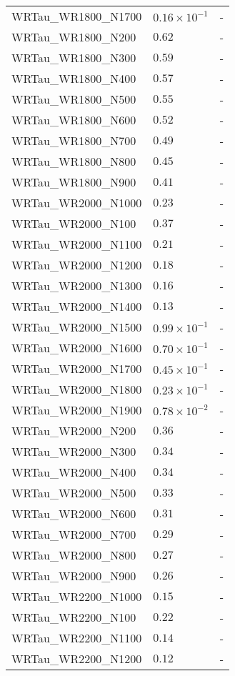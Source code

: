 \begin{longtable}[c]{| C{.35\textwidth} | C{.15\textwidth} | C{.1\textwidth}|}
    WRTau\_WR1800\_N1700 & $0.16\times10^{-1}$ & - \\
    WRTau\_WR1800\_N200 & $0.62$ & - \\
    WRTau\_WR1800\_N300 & $0.59$ & - \\
    WRTau\_WR1800\_N400 & $0.57$ & - \\
    WRTau\_WR1800\_N500 & $0.55$ & - \\
    WRTau\_WR1800\_N600 & $0.52$ & - \\
    WRTau\_WR1800\_N700 & $0.49$ & - \\
    WRTau\_WR1800\_N800 & $0.45$ & - \\
    WRTau\_WR1800\_N900 & $0.41$ & - \\ \hline
    WRTau\_WR2000\_N1000 & $0.23$ & - \\
    WRTau\_WR2000\_N100 & $0.37$ & - \\
    WRTau\_WR2000\_N1100 & $0.21$ & - \\
    WRTau\_WR2000\_N1200 & $0.18$ & - \\
    WRTau\_WR2000\_N1300 & $0.16$ & - \\
    WRTau\_WR2000\_N1400 & $0.13$ & - \\
    WRTau\_WR2000\_N1500 & $0.99\times10^{-1}$ & - \\
    WRTau\_WR2000\_N1600 & $0.70\times10^{-1}$ & - \\
    WRTau\_WR2000\_N1700 & $0.45\times10^{-1}$ & - \\
    WRTau\_WR2000\_N1800 & $0.23\times10^{-1}$ & - \\
    WRTau\_WR2000\_N1900 & $0.78\times10^{-2}$ & - \\
    WRTau\_WR2000\_N200 & $0.36$ & - \\
    WRTau\_WR2000\_N300 & $0.34$ & - \\
    WRTau\_WR2000\_N400 & $0.34$ & - \\
    WRTau\_WR2000\_N500 & $0.33$ & - \\
    WRTau\_WR2000\_N600 & $0.31$ & - \\
    WRTau\_WR2000\_N700 & $0.29$ & - \\
    WRTau\_WR2000\_N800 & $0.27$ & - \\
    WRTau\_WR2000\_N900 & $0.26$ & - \\ \hline
    WRTau\_WR2200\_N1000 & $0.15$ & - \\
    WRTau\_WR2200\_N100 & $0.22$ & - \\
    WRTau\_WR2200\_N1100 & $0.14$ & - \\
    WRTau\_WR2200\_N1200 & $0.12$ & - \\

\end{longtable}
